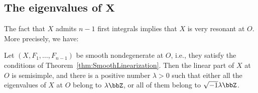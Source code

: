 \subsection[The eigenvalues of $X$]{The eigenvalues of $\boldsymbol{X}$}

The fact that $X$ admits $n-1$ f\/irst integrals implies that $X$ is very resonant at $O$. More precisely, we have:

\begin{lem} \label{lem:HypOrEl}
 Let $(X,F_1,\dots,F_{n-1})$ be smooth nondegenerate at $O$, i.e., they satisfy the conditions of Theorem~{\rm \ref{thm:SmoothLinearization}}.
Then the linear part of $X$ at $O$ is semisimple, and there is a positive number $\lambda > 0$ such that either all the eigenvalues of $X$ at $O$ belong to $\lambda \bbZ$, or all of them belong to $\sqrt{-1} \lambda \bbZ$.
\end{lem}

